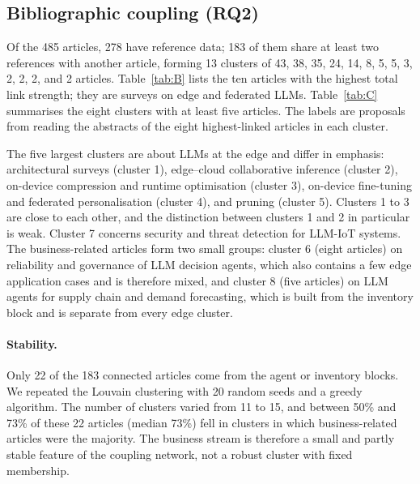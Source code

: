 



\subsection{Bibliographic coupling (RQ2)}
Of the 485 articles, 278 have reference data; 183 of them share at least two references with another article, forming 13 clusters of 43, 38, 35, 24, 14, 8, 5, 5, 3, 2, 2, 2, and 2 articles. Table~\ref{tab:B} lists the ten articles with the highest total link strength; they are surveys on edge and federated LLMs. Table~\ref{tab:C} summarises the eight clusters with at least five articles. The labels are proposals from reading the abstracts of the eight highest-linked articles in each cluster. 

The five largest clusters are about LLMs at the edge and differ in emphasis: architectural surveys (cluster 1), edge--cloud collaborative inference (cluster 2), on-device compression and runtime optimisation (cluster 3), on-device fine-tuning and federated personalisation (cluster 4), and pruning (cluster 5). Clusters 1 to 3 are close to each other, and the distinction between clusters 1 and 2 in particular is weak. Cluster 7 concerns security and threat detection for LLM-IoT systems. The business-related articles form two small groups: cluster 6 (eight articles) on reliability and governance of LLM decision agents, which also contains a few edge application cases and is therefore mixed, and cluster 8 (five articles) on LLM agents for supply chain and demand forecasting, which is built from the inventory block and is separate from every edge cluster.

\paragraph{Stability.}
Only 22 of the 183 connected articles come from the agent or inventory blocks. We repeated the Louvain clustering with 20 random seeds and a greedy algorithm. The number of clusters varied from 11 to 15, and between 50\% and 73\% of these 22 articles (median 73\%) fell in clusters in which business-related articles were the majority. The business stream is therefore a small and partly stable feature of the coupling network, not a robust cluster with fixed membership.




